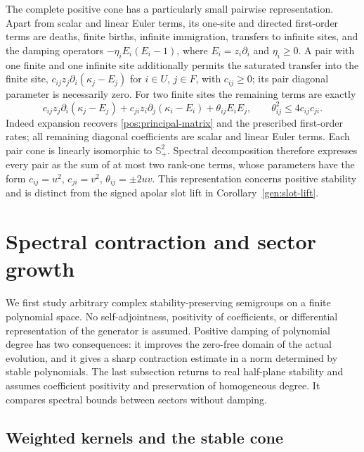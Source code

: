\documentclass[reqno]{amsart}
\theoremstyle{definition}
\theoremstyle{remark}
\begin{document}
The complete positive cone has a particularly small pairwise representation.
Apart from scalar and linear Euler terms, its one-site and directed
first-order terms are deaths, finite births, infinite immigration,
transfers to infinite sites, and the damping operators
\(-\eta_iE_i(E_i-1)\), where \(E_i=z_i\partial_i\) and \(\eta_i\geq0\).
A pair with one finite and one infinite site additionally permits the
saturated transfer into the finite site,
\(c_{ij}z_j\partial_i(\kappa_j-E_j)\) for \(i\in U\), \(j\in F\),
with \(c_{ij}\geq0\); its pair diagonal parameter is necessarily zero.
For two finite sites the remaining terms are exactly
\begin{equation}\label{gen:eq-positive-pair}
 c_{ij}z_j\partial_i(\kappa_j-E_j)
 +c_{ji}z_i\partial_j(\kappa_i-E_i)+\theta_{ij}E_iE_j,
 \qquad \theta_{ij}^2\leq4c_{ij}c_{ji}.
\end{equation}
Indeed expansion recovers \eqref{pos:principal-matrix} and the prescribed
first-order rates; all remaining diagonal coefficients are scalar and
linear Euler terms.  Each pair cone is linearly isomorphic to
\(\mathbb S_+^2\).  Spectral decomposition therefore expresses every pair
as the sum of at most two rank-one terms, whose parameters have the form
\(c_{ij}=u^2\), \(c_{ji}=v^2\), \(\theta_{ij}=\pm2uv\).
This representation concerns positive stability and is distinct from the
signed apolar slot lift in Corollary~\ref{gen:slot-lift}.


\section{Spectral contraction and sector growth}\label{spec:section}

We first study arbitrary complex stability-preserving
semigroups on a finite polynomial space.  No self-adjointness, positivity of
coefficients, or differential representation of the generator is assumed.
Positive damping of polynomial degree has two consequences: it improves the
zero-free domain of the actual evolution, and it gives a sharp contraction
estimate in a norm determined by stable polynomials.
The last subsection returns to real half-plane stability and assumes
coefficient positivity and preservation of homogeneous degree.
It compares spectral bounds between sectors without damping.

\subsection{Weighted kernels and the stable cone}
\end{document}
